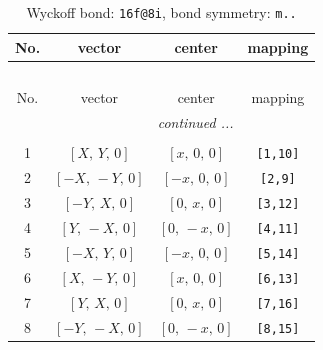 \documentclass[fleqn,8pt]{jsarticle}
\begin{document}
\begin{longtable}{cccc}
\caption{Wyckoff bond: {\tt 16f@8i}, bond symmetry: {\tt m..}}
 \\
 \hline \hline
No. & vector & center & mapping \\ \hline \endfirsthead

\multicolumn{3}{l}{\tablename\ \thetable{}} \\
 \hline \hline
No. & vector & center & mapping \\ \hline \endhead

 \hline \hline
\multicolumn{3}{r}{\footnotesize\it continued ...} \\ \endfoot

 \hline \hline
\multicolumn{3}{r}{} \\ \endlastfoot

1 & $\left[ X,\, Y,\, 0 \right]$ & $\left[ x,\, 0,\, 0 \right]$ & {\tt [1,10]} \\ \hline
2 & $\left[ - X,\, - Y,\, 0 \right]$ & $\left[ - x,\, 0,\, 0 \right]$ & {\tt [2,9]} \\ \hline
3 & $\left[ - Y,\, X,\, 0 \right]$ & $\left[ 0,\, x,\, 0 \right]$ & {\tt [3,12]} \\ \hline
4 & $\left[ Y,\, - X,\, 0 \right]$ & $\left[ 0,\, - x,\, 0 \right]$ & {\tt [4,11]} \\ \hline
5 & $\left[ - X,\, Y,\, 0 \right]$ & $\left[ - x,\, 0,\, 0 \right]$ & {\tt [5,14]} \\ \hline
6 & $\left[ X,\, - Y,\, 0 \right]$ & $\left[ x,\, 0,\, 0 \right]$ & {\tt [6,13]} \\ \hline
7 & $\left[ Y,\, X,\, 0 \right]$ & $\left[ 0,\, x,\, 0 \right]$ & {\tt [7,16]} \\ \hline
8 & $\left[ - Y,\, - X,\, 0 \right]$ & $\left[ 0,\, - x,\, 0 \right]$ & {\tt [8,15]} \\
\end{longtable}
\renewcommand{\arraystretch}{1.2}
\end{document}
